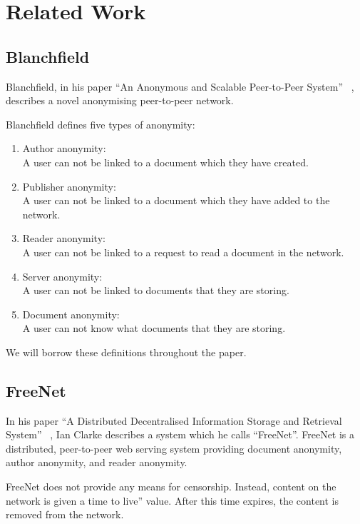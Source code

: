\chapter{Related Work}

\section{Blanchfield}

Blanchfield, in his paper ``An Anonymous and Scalable Peer-to-Peer System'' ~\cite{blanchfield},
describes a novel anonymising peer-to-peer network.

Blanchfield defines five types of anonymity:
\begin{enumerate}
    \item{Author anonymity: \\
        A user can not be linked to a document which they have created.
    }
    \item{Publisher anonymity: \\
        A user can not be linked to a document which they have added to the network.
    }
    \item{Reader anonymity: \\
        A user can not be linked to a request to read a document in the network.
    }
    \item{Server anonymity: \\
        A user can not be linked to documents that they are storing.
    }
    \item{Document anonymity: \\
        A user can not know what documents that they are storing.
    }
\end{enumerate}

We will borrow these definitions throughout the paper.

\section{FreeNet}

In his paper ``A Distributed Decentralised Information Storage and Retrieval System'' ~\cite{freenet},
Ian Clarke describes a system which he calls ``FreeNet''. FreeNet is a distributed, peer-to-peer web
serving system providing document anonymity, author anonymity, and reader anonymity.

FreeNet does not provide any means for censorship. Instead, content on the network is given a
time to live'' value. After this time expires, the content is removed from the network.

